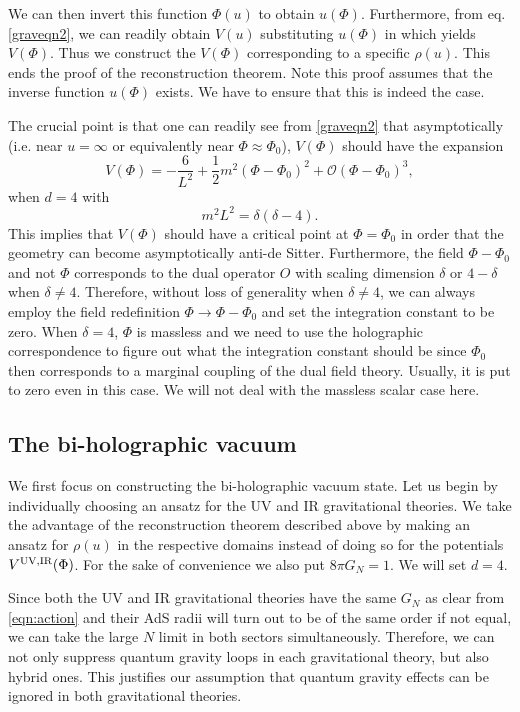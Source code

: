 \documentclass[prd,reprint,a4paper,showpacs,superscriptaddress,11pt,onecolumn,nofootinbib]{revtex4-1}
\renewcommand{\(}{\left(}
\renewcommand{\)}{\right)}
\newcommand{\6}{\partial}
\begin{document}
We can then invert this function $\Phi(u)$ to obtain $u(\Phi)$. Furthermore, from eq. \eqref{graveqn2}, we can readily obtain $V(u)$ substituting $u(\Phi)$ in which yields $V(\Phi)$. Thus we construct the $V(\Phi)$ corresponding to a specific $\rho(u)$. This ends the proof of the reconstruction theorem. Note this proof assumes that the inverse function $u(\Phi)$ exists. We have to ensure that this is indeed the case.  

The crucial point is that one can readily see from \eqref{graveqn2} that asymptotically (i.e. near $u= \infty$ or equivalently near $\Phi \approx \Phi_0$), $V(\Phi)$ should have the expansion
\begin{equation}
V(\Phi) = - \frac{6}{L^2} + \frac{1}{2}m^2 (\Phi - \Phi_0)^2 + \mathcal{O}(\Phi - \Phi_0)^3,
\end{equation}
when $d=4$ with
\begin{equation}
m^2 L^2 = \delta (\delta -4).
\end{equation}
This implies that $V(\Phi)$ should have a critical point at $\Phi = \Phi_0$ in order that the geometry can become asymptotically anti-de Sitter. Furthermore, the field $\Phi - \Phi_0$ and not $\Phi$ corresponds to the dual operator $O$ with scaling dimension $\delta$ or $4- \delta$ when $\delta \neq 4$. Therefore, without loss of generality when $\delta \neq 4$, we can always employ the field redefinition $\Phi \rightarrow \Phi - \Phi_0$ and set the integration constant to be zero. When $\delta = 4$, $\Phi$ is massless and we need to use the holographic correspondence to figure out what the integration constant should be since $\Phi_0$ then corresponds to a marginal coupling of the dual field theory. Usually, it is put to zero even in this case. We will not deal with the massless scalar case here.

\subsection{The bi-holographic vacuum}
We first focus on constructing the bi-holographic vacuum state. Let us begin by individually choosing an ansatz for the UV and IR gravitational theories. We take the advantage of the reconstruction theorem described above by making an ansatz for $\rho(u)$ in the respective domains instead of doing so for the potentials $V^{\rm UV,IR}(\Phi)$. For the sake of convenience we also put $8 \pi G_N = 1$. We will set $d=4$. 

Since both the UV and IR gravitational theories have the same $G_N$ as clear from \eqref{eqn:action} and their AdS radii will turn out to be of the same order if not equal, we can take the large $N$ limit in both sectors simultaneously. Therefore, we can not only suppress quantum gravity loops in each gravitational theory, but also hybrid ones. This justifies our assumption that quantum gravity effects can be ignored in both gravitational theories. 
\end{document}
